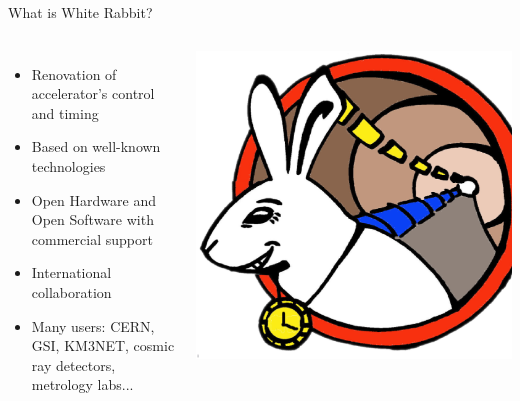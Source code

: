 \documentclass[compress,red]{beamer}
\begin{document}
\begin{frame}{What is White Rabbit?}

\begin{columns}[c]
	  \begin{itemize}
		\item Renovation of accelerator's control and timing
		\item Based on well-known technologies
		\item Open Hardware and Open Software with commercial support
		\item International collaboration
    \item Many users: CERN, GSI, KM3NET, cosmic ray detectors, metrology labs...
	  \end{itemize}
		\begin{center}
		\includegraphics[width=1.0\textwidth]{../../figures/logo/WRlogo.ps}
		\end{center}
	\end{columns}
\end{frame}
\end{document}
